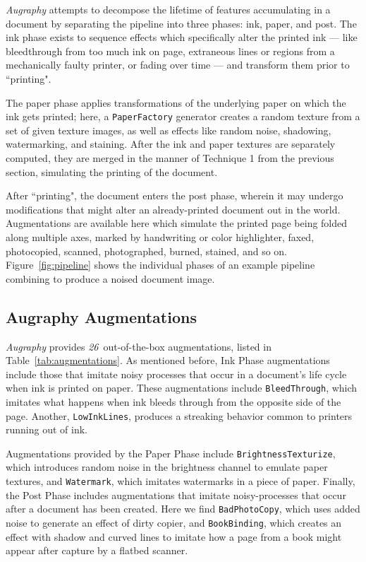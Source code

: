 \documentclass[runningheads]{llncs}
\newcommand{\numAugraphyAugmentations}{\emph{26}}
\begin{document}
\emph{Augraphy} attempts to decompose the lifetime of features accumulating in a document by separating the pipeline into three phases: ink, paper, and post.
The ink phase exists to sequence effects which specifically alter the printed ink --- like bleedthrough from too much ink on page, extraneous lines or regions from a mechanically faulty printer, or fading over time --- and transform them prior to ``printing".

The paper phase applies transformations of the underlying paper on which the ink gets printed; here, a \texttt{PaperFactory} generator creates a random texture from a set of given texture images, as well as effects like random noise, shadowing, watermarking, and staining.
After the ink and paper textures are separately computed, they are merged in the manner of Technique 1 from the previous section, simulating the printing of the document.

After ``printing", the document enters the post phase, wherein it may undergo modifications that might alter an already-printed document out in the world.
Augmentations are available here which simulate the printed page being folded along multiple axes, marked by handwriting or color highlighter, faxed, photocopied, scanned, photographed, burned, stained, and so on.
Figure~\ref{fig:pipeline} shows the individual phases of an example pipeline combining to produce a noised document image.

\subsection{Augraphy Augmentations}

\emph{Augraphy} provides \numAugraphyAugmentations ~out-of-the-box augmentations, listed in Table~\ref{tab:augmentations}.
As mentioned before, Ink Phase augmentations include those that imitate noisy processes that occur in a document's life cycle when ink is printed on paper.
These augmentations include \texttt{BleedThrough}, which imitates what happens when ink bleeds through from the opposite side of the page.
Another, \texttt{LowInkLines}, produces a streaking behavior common to printers running out of ink.

Augmentations provided by the Paper Phase include \texttt{BrightnessTexturize}, which introduces random noise in the brightness channel to emulate paper textures, and \texttt{Watermark}, which imitates watermarks in a piece of paper.
Finally, the Post Phase includes augmentations that imitate noisy-processes that occur after a document has been created.
Here we find \texttt{BadPhotoCopy}, which uses added noise to generate an effect of dirty copier, and \texttt{BookBinding}, which creates an effect with shadow and curved lines to imitate how a page from a book might appear after capture by a flatbed scanner.
\end{document}
